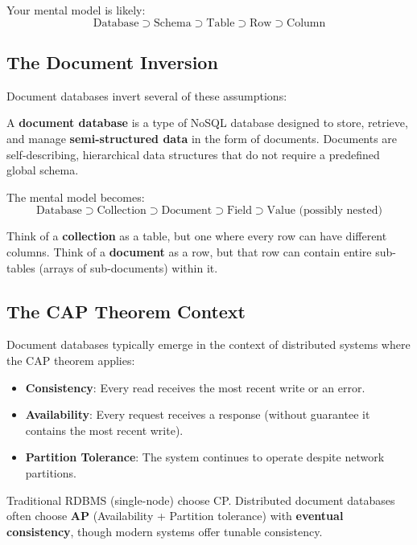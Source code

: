 \documentclass[12pt,a4paper]{article}
\begin{document}
Your mental model is likely:\[\text{Database} \supset \text{Schema} \supset \text{Table} \supset \text{Row} \supset \text{Column}\]

\subsection{The Document Inversion}

Document databases invert several of these assumptions:

\begin{definition}
A \textbf{document database} is a type of NoSQL database designed to store, retrieve, and manage \textbf{semi-structured data} in the form of documents. Documents are self-describing, hierarchical data structures that do not require a predefined global schema.
\end{definition}

The mental model becomes:\[\text{Database} \supset \text{Collection} \supset \text{Document} \supset \text{Field} \supset \text{Value (possibly nested)}\]

\begin{rdbmsnote}
Think of a \textbf{collection} as a table, but one where every row can have different columns. Think of a \textbf{document} as a row, but that row can contain entire sub-tables (arrays of sub-documents) within it.
\end{rdbmsnote}

\subsection{The CAP Theorem Context}

Document databases typically emerge in the context of distributed systems where the CAP theorem applies:

\begin{itemize}[noitemsep]
    \item \textbf{Consistency}: Every read receives the most recent write or an error.
    \item \textbf{Availability}: Every request receives a response (without guarantee it contains the most recent write).
    \item \textbf{Partition Tolerance}: The system continues to operate despite network partitions.
\end{itemize}

Traditional RDBMS (single-node) choose CP. Distributed document databases often choose \textbf{AP} (Availability + Partition tolerance) with \textbf{eventual consistency}, though modern systems offer tunable consistency.
\end{document}
